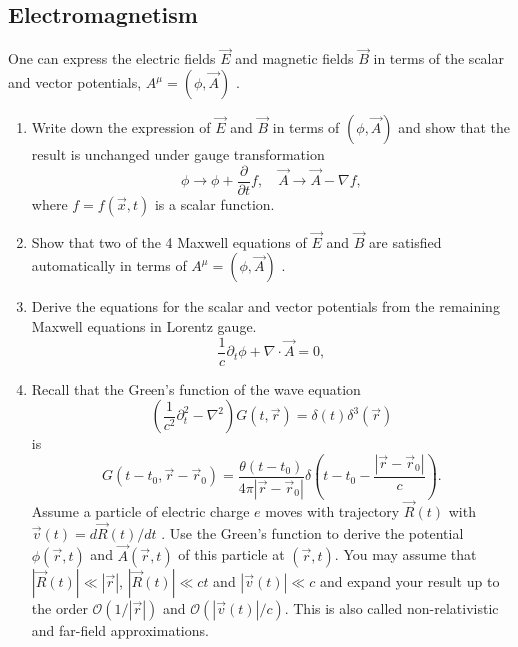 \subsection{Electromagnetism}

\begin{exercise}
\label{physics:2023:3}
One can express the electric fields $\vec { E }$ and magnetic fields $\vec { B }$ in terms of the scalar and vector potentials, $A ^ { \mu } = \left( \phi , { \vec { A } } \right)$ .

\begin{enumerate}[label=(\alph*)]
    \item Write down the expression of $\vec { E }$ and $\vec { B }$ in terms of $( \phi , { \vec { A } } )$ and show that the result is unchanged under gauge transformation
    \begin{equation}
        \phi \rightarrow \phi + \frac{\partial}{\partial t} f, \quad \vec {A} \rightarrow \vec {A} - \nabla f, \label{eq:2023:3:4}
    \end{equation}
    where $f = f(\vec{x}, t)$ is a scalar function.
    \item Show that two of the 4 Maxwell equations of $\vec { E }$ and $\vec { B }$ are satisfied automatically in terms of $A ^ { \mu } = \left( \phi , { \vec { A } } \right)$ .
    \item Derive the equations for the scalar and vector potentials from the remaining Maxwell equations in Lorentz gauge.
    \begin{equation}
        \frac{1}{c} \partial_t \phi + \nabla \cdot \vec{A} = 0, \label{eq:2023:3:5}
    \end{equation}
    \item Recall that the Green's function of the wave equation
    \begin{equation}
        \left(\frac{1}{c^2} \partial_t^2 - \nabla^2\right) G(t, \vec{r}) = \delta(t) \delta^3(\vec{r}) \label{eq:2023:3:6}
    \end{equation}
    is
    \begin{equation}
        G (t - t _ {0}, \vec {r} - \vec {r} _ {0}) = \frac {\theta (t - t _ {0})}{4 \pi | \vec {r} - \vec {r} _ {0} |} \delta \left(t - t _ {0} - \frac {| \vec {r} - \vec {r} _ {0} |}{c}\right). \label{eq:2023:3:7}
    \end{equation}
    Assume a particle of electric charge $e$ moves with trajectory $\vec { R } ( t )$ with ${ \vec { v } } ( t ) = d \vec { R } ( t ) / d t$ . Use the Green's function to derive the potential $\phi ( \vec { r } , t )$ and $\vec { A } ( \vec { r } , t )$ of this particle at $( \vec { r } , t )$. You may assume that $|\vec{R}(t)| \ll |\vec{r}|$, $|\vec{R}(t)| \ll ct$ and $|\vec{v}(t)| \ll c$ and expand your result up to the order $\mathcal{O}(1/|\vec{r}|)$ and $\mathcal{O}(|\vec{v}(t)|/c)$. This is also called non-relativistic and far-field approximations.
\end{enumerate}
\end{exercise}

